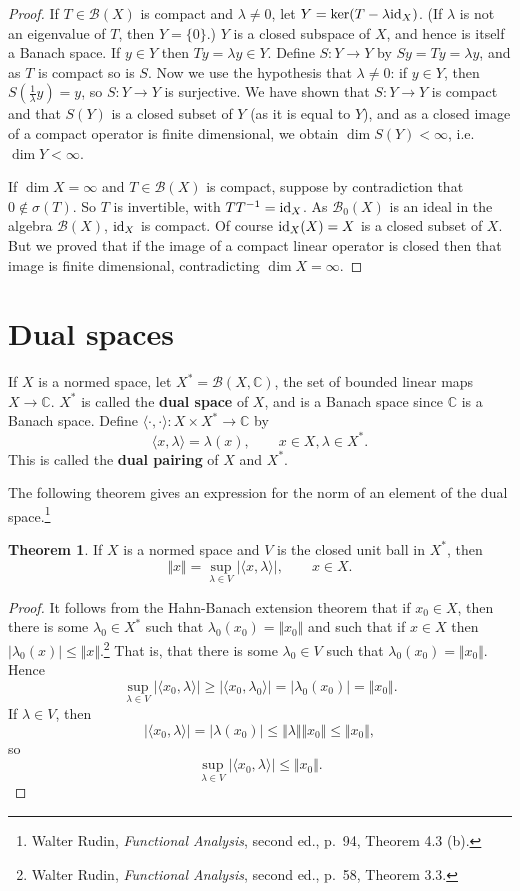 \documentclass{article}
\newcommand{\inner}[2]{\langle #1, #2 \rangle}
\newcommand{\id}{\ensuremath\mathrm{id}}
\newcommand{\norm}[1]{\Vert #1 \Vert}
\theoremstyle{definition}
\newtheorem{theorem}{Theorem}
\begin{document}
\begin{proof}
If $T \in \mathscr{B}(X)$ is compact and $\lambda \neq 0$, let $Y = \ker (T-\lambda \id_X)$.
(If $\lambda$ is not an eigenvalue of $T$, then $Y=\{0\}$.)
$Y$ is a closed subspace of $X$, and hence is itself a Banach space.
If $y \in Y$ then $Ty=\lambda y \in Y$. Define $S:Y \to Y$ by $Sy=Ty=\lambda y$, and as $T$ is compact so is $S$.
Now we use the hypothesis that $\lambda \neq 0$:
if $y \in Y$, then $S(\frac{1}{\lambda}y)=y$, so $S:Y \to Y$ is surjective. We have shown that
 $S:Y \to Y$ is compact and that $S(Y)$ is a closed subset of $Y$ (as it is equal to $Y$), and as a closed image of a compact operator
 is finite dimensional, we obtain
$\dim S(Y) <\infty$, i.e. $\dim Y< \infty$.

If $\dim X=\infty$ and $T \in \mathscr{B}(X)$ is compact, suppose by contradiction that $0 \not \in \sigma(T)$. So
$T$ is invertible, with $TT^{-1}=\id_X$. As $\mathscr{B}_0(X)$ is an ideal in the algebra $\mathscr{B}(X)$, $\id_X$ is compact. 
Of course $\id_X(X)=X$ is a closed subset of $X$. But we proved that if the image of a compact linear operator is closed then that image
is finite dimensional, contradicting $\dim X=\infty$.
\end{proof}



\section{Dual spaces}
If $X$ is a normed space, let $X^*=\mathscr{B}(X,\mathbb{C})$,  the set of bounded linear maps $X \to \mathbb{C}$. $X^*$ is called the \textbf{dual space} of $X$, and is a Banach space
since $\mathbb{C}$ is a Banach space. Define $\inner{\cdot}{\cdot}:X \times X^* \to \mathbb{C}$ by 
\[
\inner{x}{\lambda}=\lambda(x), \qquad x \in X, \lambda \in X^*.
\]
This is called the \textbf{dual pairing} of $X$ and $X^*$. 

The following theorem gives an expression for the norm of an element of the dual space.\footnote{Walter
Rudin, {\em Functional Analysis}, second ed., p.~94, Theorem 4.3 (b).} 


\begin{theorem}
If $X$ is a normed space and $V$ is the closed unit ball in $X^*$, then
\[
\norm{x}=\sup_{\lambda \in V} |\inner{x}{\lambda}|, \qquad x \in X.
\]
\label{normexpression1}
\end{theorem}
\begin{proof}
It follows from the Hahn-Banach extension theorem that if $x_0 \in X$, then there is some $\lambda_0 \in X^*$ such that $\lambda_0(x_0)=\norm{x_0}$
and such that if $x \in X$ then $|\lambda_0(x)| \leq \norm{x}$.\footnote{Walter Rudin, {\em Functional Analysis}, second ed., 
p.~58, Theorem 3.3.} That is, that there is some $\lambda_0 \in V$ such that $\lambda_0(x_0)=\norm{x_0}$.
Hence
\[
\sup_{\lambda \in V} |\inner{x_0}{\lambda}| \geq |\inner{x_0}{\lambda_0}| = |\lambda_0(x_0)|= \norm{x_0}.
\]
If $\lambda \in V$, then
\[
|\inner{x_0}{\lambda}| = |\lambda(x_0)| \leq \norm{\lambda} \norm{x_0} \leq \norm{x_0},
\]
so
\[
\sup_{\lambda \in V} |\inner{x_0}{\lambda}| \leq \norm{x_0}.
\]
\end{proof}
\end{document}
